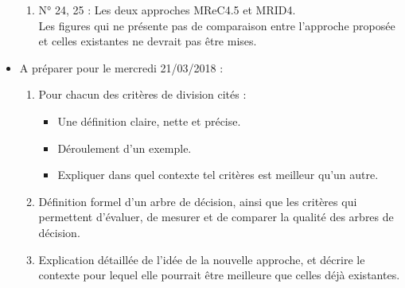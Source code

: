 \documentclass[a4paper, 11pt]{report}
\begin{document}
\begin{itemize}
\begin{enumerate}
\item N° 24, 25 : Les deux approches MReC4.5 et MRID4.\\
Les figures qui ne présente pas de comparaison entre l'approche proposée et celles existantes ne devrait pas être mises.\\ 
\end{enumerate}

\item A préparer pour le mercredi 21\//03\//2018 : 
\begin{enumerate}
\item Pour chacun des critères de division cités :
\begin{itemize}
\item Une définition claire, nette et précise.
\item Déroulement d'un exemple.
\item Expliquer dans quel contexte tel critères est meilleur qu'un autre.
\end{itemize}

\item Définition formel d'un arbre de décision, ainsi que les critères qui permettent d'évaluer, de mesurer et de comparer la qualité des arbres de décision.

\item Explication détaillée de l'idée de la nouvelle approche, et décrire le contexte pour lequel elle pourrait être meilleure que celles déjà existantes.

\end{enumerate}

\end{itemize}
\end{document}

